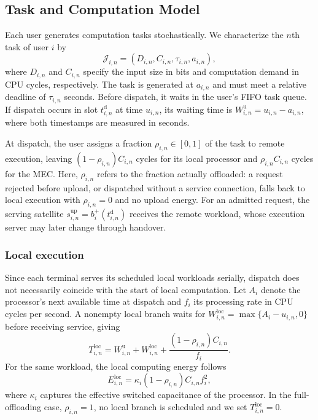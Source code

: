 \documentclass[journal]{IEEEtran}
\begin{document}
\subsection{Task and Computation Model}
\label{subsec:task_computation_model}

Each user generates computation tasks stochastically.
We characterize the $n$th task of user $i$ by
\begin{equation}
\mathcal{J}_{i,n}=
\left(D_{i,n},C_{i,n},\tau_{i,n},a_{i,n}\right),
\label{eq:task_definition}
\end{equation}
where $D_{i,n}$ and $C_{i,n}$ specify the input size
in bits and computation demand in CPU cycles, respectively.
The task is generated at $a_{i,n}$ and must meet a relative
deadline of $\tau_{i,n}$ seconds. Before dispatch, it
waits in the user's FIFO task queue. If dispatch occurs
in slot $t_{i,n}^{\mathrm d}$ at time $u_{i,n}$, its
waiting time is $W^{\mathrm u}_{i,n}=u_{i,n}-a_{i,n}$,
where both timestamps are measured in seconds.

At dispatch, the user assigns a fraction
$\rho_{i,n}\in[0,1]$ of the task to remote execution,
leaving $(1-\rho_{i,n})C_{i,n}$ cycles for its local
processor and $\rho_{i,n}C_{i,n}$ cycles for the MEC.
Here, $\rho_{i,n}$ refers to the fraction actually
offloaded: a request rejected before upload, or dispatched
without a service connection, falls back to local execution
with $\rho_{i,n}=0$ and no upload energy. For an admitted
request, the serving satellite
$s_{i,n}^{\mathrm{up}}=b_i^{+}(t_{i,n}^{\mathrm d})$
receives the remote workload, whose execution server
may later change through handover.

\subsubsection{Local execution}

Since each terminal serves its scheduled local workloads
serially, dispatch does not necessarily coincide with the
start of local computation. Let $A_i$ denote the processor's
next available time at dispatch and $f_i$ its processing
rate in CPU cycles per second. A nonempty local branch
waits for $W^{\mathrm{loc}}_{i,n}=\max\{A_i-u_{i,n},0\}$
before receiving service, giving
\begin{equation}
T^{\mathrm{loc}}_{i,n}=
W^{\mathrm u}_{i,n}
+W^{\mathrm{loc}}_{i,n}
+\frac{(1-\rho_{i,n})C_{i,n}}{f_i}.
\label{eq:local_delay}
\end{equation}
For the same workload, the local computing energy follows
\begin{equation}
E^{\mathrm{loc}}_{i,n}
=\kappa_i(1-\rho_{i,n})C_{i,n}f_i^2,
\label{eq:local_energy}
\end{equation}
where $\kappa_i$ captures the effective switched
capacitance of the processor. In the full-offloading
case, $\rho_{i,n}=1$, no local branch is scheduled and
we set $T^{\mathrm{loc}}_{i,n}=0$.
\end{document}
